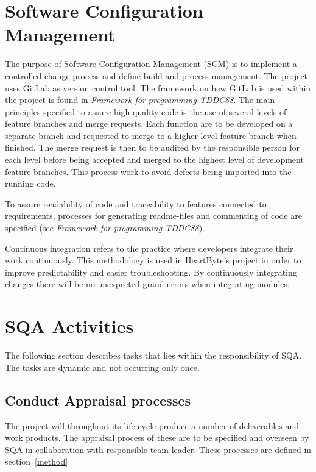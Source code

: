 \documentclass{article}
\begin{document}
	\section{Software Configuration Management}
	The purpose of Software Configuration Management (SCM) is to implement a controlled change process and define build and process management. The project uses GitLab as version control tool. The framework on how GitLab is used within the project is found in \textit{Framework for programming TDDC88}. The main principles specified to assure high quality code is the use of several levels of feature branches and merge requests. Each function are to be developed on a separate branch and requested to merge to a higher level feature branch when finished. The merge request is then to be audited by the responsible person for each level before being accepted and merged to the highest level of development feature branches. This process work to avoid defects being imported into the running code.
	
	To assure readability of code and traceability to features connected to requirements, processes for generating readme-files and commenting of code are specified (see \textit{Framework for programming TDDC88}).
	
	Continuous integration refers to the practice where developers integrate their work continuously. This methodology is used in HeartByte's project in order to improve predictability and easier troubleshooting. By continuously integrating changes there will be no unexpected grand errors when integrating modules.

	\clearpage
	\section{SQA Activities}
	The following section describes tasks that lies within the responsibility of SQA. The tasks are dynamic and not occurring only once.  
	
	
	\subsection{Conduct Appraisal processes}
	The project will throughout its life cycle produce a number of deliverables and work products. The appraisal process of these are to be specified and overseen by SQA in collaboration with responsible team leader. These processes are defined in section~\ref{method} 
		
\end{document}
